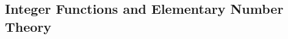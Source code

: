 \tasktodo

\tasktodo

\tasktodo

\tasktodo

\tasktodo

\tasktodo

\tasktodo

\subsection{Integer Functions and Elementary Number Theory}

\tasktodo

\tasktodo

\tasktodo

\tasktodo

\tasktodo

\tasktodo

\tasktodo

\tasktodo

\tasktodo

\tasktodo

\tasktodo

\tasktodo

\tasktodo

\tasktodo

\tasktodo

\tasktodo

\tasktodo

\tasktodo

\tasktodo

\tasktodo

\tasktodo

\tasktodo

\tasktodo

\tasktodo

\tasktodo

\tasktodo

\tasktodo

\tasktodo

